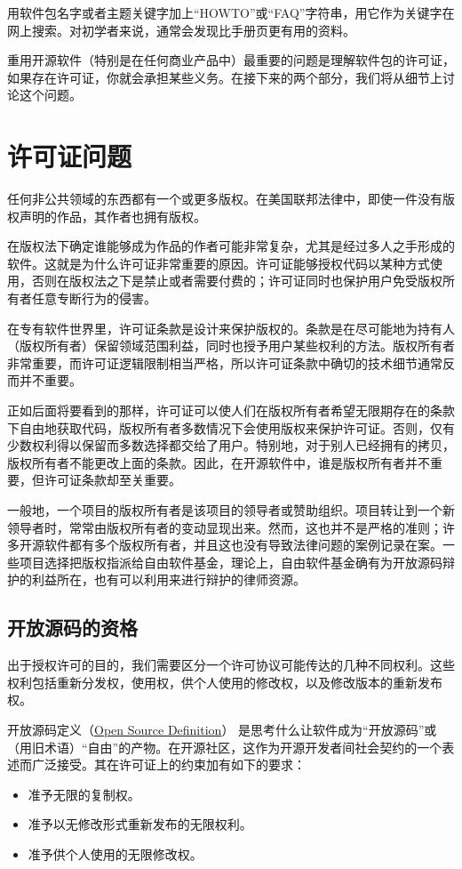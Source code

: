 \documentclass[12pt,oneside]{book}
\begin{document}
\begin{common-format}
用软件包名字或者主题关键字加上“HOWTO”或“FAQ”字符串，用它作为关键字在网上搜索。对初学者来说，通常会发现比手册页更有用的资料。

重用开源软件（特别是在任何商业产品中）最重要的问题是理解软件包的许可证，如果存在许可证，你就会承担某些义务。在接下来的两个部分，我们将从细节上讨论这个问题。


\section{许可证问题}
任何非公共领域的东西都有一个或更多版权。在美国联邦法律中，即使一件没有版权声明的作品，其作者也拥有版权。

在版权法下确定谁能够成为作品的作者可能非常复杂，尤其是经过多人之手形成的软件。这就是为什么许可证非常重要的原因。许可证能够授权代码以某种方式使用，否则在版权法之下是禁止或者需要付费的；许可证同时也保护用户免受版权所有者任意专断行为的侵害。

在专有软件世界里，许可证条款是设计来保护版权的。条款是在尽可能地为持有人（版权所有者）保留领域范围利益，同时也授予用户某些权利的方法。版权所有者非常重要，而许可证逻辑限制相当严格，所以许可证条款中确切的技术细节通常反而并不重要。

正如后面将要看到的那样，许可证可以使人们在版权所有者希望无限期存在的条款下自由地获取代码，版权所有者多数情况下会使用版权来保护许可证。否则，仅有少数权利得以保留而多数选择都交给了用户。特别地，对于别人已经拥有的拷贝，版权所有者不能更改上面的条款。因此，在开源软件中，谁是版权所有者并不重要，但许可证条款却至关重要。

一般地，一个项目的版权所有者是该项目的领导者或赞助组织。项目转让到一个新领导者时，常常由版权所有者的变动显现出来。然而，这也并不是严格的准则；许多开源软件都有多个版权所有者，并且这也没有导致法律问题的案例记录在案。一些项目选择把版权指派给自由软件基金，理论上，自由软件基金确有为开放源码辩护的利益所在，也有可以利用来进行辩护的律师资源。

\subsection{开放源码的资格}
出于授权许可的目的，我们需要区分一个许可协议可能传达的几种不同权利。这些权利包括重新分发权，使用权，供个人使用的修改权，以及修改版本的重新发布权。

开放源码定义（\href{http://www.opensource.org/osd.html}{Open Source Definition}） 是思考什么让软件成为“开放源码”或（用旧术语）“自由”的产物。在开源社区，这作为开源开发者间社会契约的一个表述而广泛接受。其在许可证上的约束加有如下的要求：
\begin{itemize}
\item 准予无限的复制权。
\item 准予以无修改形式重新发布的无限权利。
\item 准予供个人使用的无限修改权。
\end{itemize}


\end{common-format}
\end{document}
